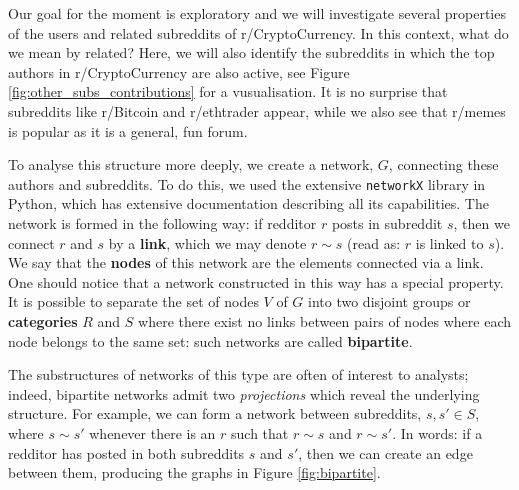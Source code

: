 \documentclass[twoside]{report}
\newcommand{\code}{\texttt}
\begin{document}
\begin{spacing}{1}


Our goal for the moment is exploratory and we will investigate several properties of the users and related subreddits of r/CryptoCurrency. In this context, what do we mean by related? Here, we will also identify the subreddits in which the top authors in r/CryptoCurrency are also active, see Figure \ref{fig:other_subs_contributions} for a vusualisation. It is no surprise that subreddits like r/Bitcoin and r/ethtrader appear, while we also see that r/memes is popular as it is a general, fun forum.

To analyse this structure more deeply, we create a network, $G$, connecting these authors and subreddits. To do this, we used the extensive \code{networkX} library in Python, which has extensive documentation describing all its capabilities. The network is formed in the following way: if redditor $r$ posts in subreddit $s$, then we connect $r$ and $s$ by a \textbf{link}, which we may denote $r \sim s$ (read as: $r$ is linked to $s$). We say that the \textbf{nodes} of this network are the elements connected via a link. One should notice that a network constructed in this way has a special property. It is possible to separate the set of nodes $V$ of $G$ into two disjoint groups or \textbf{categories} $R$ and $S$ where there exist no links between pairs of nodes where each node belongs to the same set: such networks are called \textbf{bipartite}.

The substructures of networks of this type are often of interest to analysts; indeed, bipartite networks admit two \textit{projections} which reveal the underlying structure. For example, we can form a network between subreddits, $s, s' \in S$, where $s \sim s'$ whenever there is an $r$ such that $r \sim s$ and $r\sim s'$. In words: if a redditor has posted in both subreddits $s$ and $s'$, then we can create an edge between them, producing the graphs in Figure \ref{fig:bipartite}.


\end{spacing}
\end{document}
